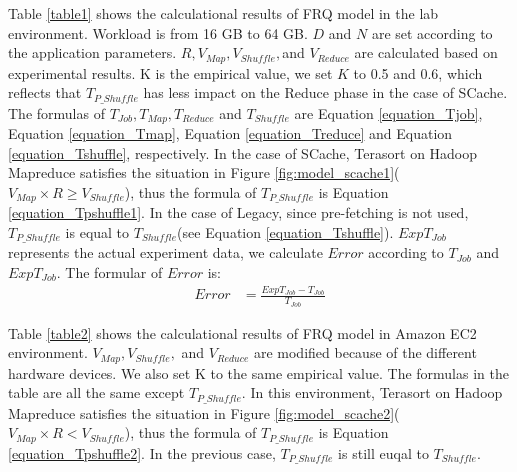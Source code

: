 {Table \ref{table1} shows the calculational results of FRQ model in the lab environment. Workload is from 16 GB to 64 GB. \(D\) and \(N\) are set according to the application parameters. \(R, V_{Map}, V_{Shuffle},\)and \(V_{Reduce}\) are calculated based on experimental results. K is the empirical value, we set \(K\) to 0.5 and 0.6, which reflects that \(T_{P\_Shuffle}\) has less impact on the Reduce phase in the case of SCache. The formulas of \(T_{Job}, T_{Map}, T_{Reduce}\) and \(T_{Shuffle}\) are Equation \ref{equation_Tjob}, Equation \ref{equation_Tmap}, Equation \ref{equation_Treduce} and Equation \ref{equation_Tshuffle}, respectively. In the case of SCache, Terasort on Hadoop Mapreduce satisfies the situation in Figure \ref{fig:model_scache1}(\(V_{Map} \times R \ge V_{Shuffle}\)), thus the formula of \(T_{P\_Shuffle}\) is Equation \ref{equation_Tpshuffle1}. In the case of Legacy, since pre-fetching is not used, \(T_{P\_Shuffle}\) is equal to \(T_{Shuffle}\)(see Equation \ref{equation_Tshuffle}). \(ExpT_{Job}\) represents the actual experiment data, we calculate \(Error\) according to \(T_{Job}\) and \(ExpT_{Job}\). The formular of \(Error\) is:
\begin{equation}
	\label{equation_error}
	\begin{aligned}
		Error &= \frac{ExpT_{Job} - T_{Job}}{T_{Job}}
	\end{aligned}
\end{equation}

Table \ref{table2} shows the calculational results of FRQ model in Amazon EC2 environment. \(V_{Map}, V_{Shuffle},\) and \(V_{Reduce}\) are modified because of the different hardware devices. We also set K to the same empirical value. The formulas in the table are all the same except \(T_{P\_Shuffle}\). In this environment, Terasort on Hadoop Mapreduce satisfies the situation in Figure \ref{fig:model_scache2}(\(V_{Map} \times R < V_{Shuffle}\)), thus the formula of \(T_{P\_Shuffle}\) is Equation \ref{equation_Tpshuffle2}. In the previous case, \(T_{P\_Shuffle}\) is still euqal to \(T_{Shuffle}\).

}
